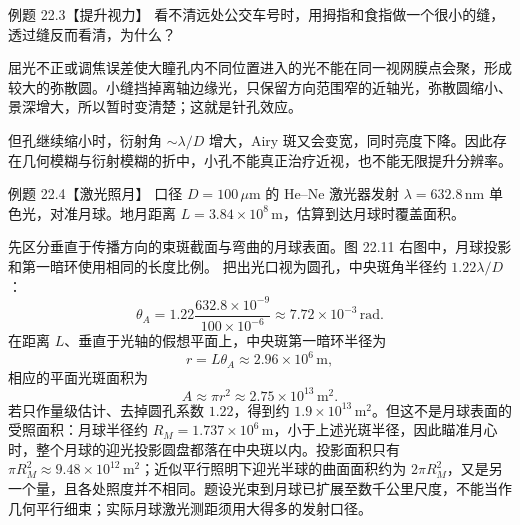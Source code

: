 \begin{origexamplebox}{例题 22.3【提升视力】}
看不清远处公交车号时，用拇指和食指做一个很小的缝，透过缝反而看清，为什么？
\end{origexamplebox}
\begin{xesolution}
屈光不正或调焦误差使大瞳孔内不同位置进入的光不能在同一视网膜点会聚，形成较大的弥散圆。小缝挡掉离轴边缘光，只保留方向范围窄的近轴光，弥散圆缩小、景深增大，所以暂时变清楚；这就是针孔效应。

但孔继续缩小时，衍射角 $\sim\lambda/D$ 增大，Airy 斑又会变宽，同时亮度下降。因此存在几何模糊与衍射模糊的折中，小孔不能真正治疗近视，也不能无限提升分辨率。
\end{xesolution}

\begin{origexamplebox}{例题 22.4【激光照月】}
口径 $D=100\,\mu\mathrm m$ 的 He--Ne 激光器发射 $\lambda=632.8\,\mathrm{nm}$ 单色光，对准月球。地月距离 $L=3.84\times10^8\,\mathrm m$，估算到达月球时覆盖面积。
\end{origexamplebox}
\begin{xesolution}
先区分垂直于传播方向的束斑截面与弯曲的月球表面。图 22.11 右图中，月球投影和第一暗环使用相同的长度比例。
\LaserMoonDiagram
把出光口视为圆孔，中央斑角半径约 $1.22\lambda/D$：
\[
 \theta_A=1.22\frac{632.8\times10^{-9}}{100\times10^{-6}}
 \approx7.72\times10^{-3}\,\mathrm{rad}.
\]
在距离 $L$、垂直于光轴的假想平面上，中央斑第一暗环半径为
\[
 r=L\theta_A\approx2.96\times10^6\,\mathrm m,
\]
相应的平面光斑面积为
\[
 \boxed{A\approx\pi r^2\approx2.75\times10^{13}\,\mathrm{m^2}}.
\]
若只作量级估计、去掉圆孔系数 $1.22$，得到约 $1.9\times10^{13}\,\mathrm{m^2}$。但这不是月球表面的受照面积：月球半径约 $R_M=1.737\times10^6\,\mathrm m$，小于上述光斑半径，因此瞄准月心时，整个月球的迎光投影圆盘都落在中央斑以内。投影面积只有 $\pi R_M^2\approx9.48\times10^{12}\,\mathrm{m^2}$；近似平行照明下迎光半球的曲面面积约为 $2\pi R_M^2$，又是另一个量，且各处照度并不相同。题设光束到月球已扩展至数千公里尺度，不能当作几何平行细束；实际月球激光测距须用大得多的发射口径。
\end{xesolution}

